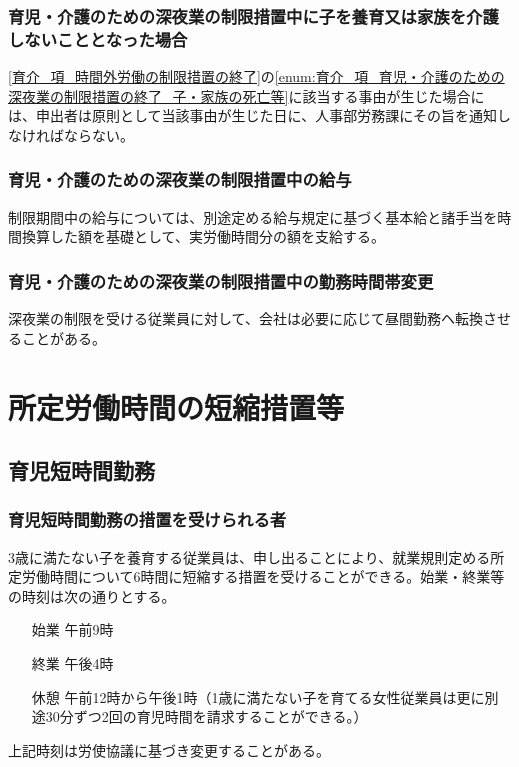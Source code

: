 \documentclass{jsarticle}
\begin{document}
\subsubsection{育児・介護のための深夜業の制限措置中に子を養育又は家族を介護しないこととなった場合}
\label{育介_項_育児・介護のための深夜業の制限措置中に子を養育又は家族を介護しないこととなった場合}
\ref{育介_項_時間外労働の制限措置の終了}の\ref{enum:育介_項_育児・介護のための深夜業の制限措置の終了_子・家族の死亡等}に該当する事由が生じた場合には、申出者は原則として当該事由が生じた日に、人事部労務課にその旨を通知しなければならない。

\subsubsection{育児・介護のための深夜業の制限措置中の給与}
\label{育介_項_育児・介護のための深夜業の制限措置中の給与}
制限期間中の給与については、別途定める給与規定に基づく基本給と諸手当を時間換算した額を基礎として、実労働時間分の額を支給する。
\subsubsection{育児・介護のための深夜業の制限措置中の勤務時間帯変更}
\label{育介_項_育児・介護のための深夜業の制限措置中の勤務時間帯変更}
深夜業の制限を受ける従業員に対して、会社は必要に応じて昼間勤務ヘ転換させることがある。 

\section{所定労働時間の短縮措置等}

\subsection{育児短時間勤務}
\label{育介_条_育児短時間勤務}

\subsubsection{育児短時間勤務の措置を受けられる者}
\label{育介_項_育児短時間勤務の措置を受けられる者}
3歳に満たない子を養育する従業員は、申し出ることにより、就業規則定める所定労働時間について6時間に短縮する措置を受けることができる。始業・終業等の時刻は次の通りとする。
\begin{enumerate}
  \item[始業]午前9時
  \item[終業]午後4時
  \item[休憩]午前12時から午後1時（1歳に満たない子を育てる女性従業員は更に別途30分ずつ2回の育児時間を請求することができる。）
\end{enumerate}
上記時刻は労使協議に基づき変更することがある。
\end{document}
